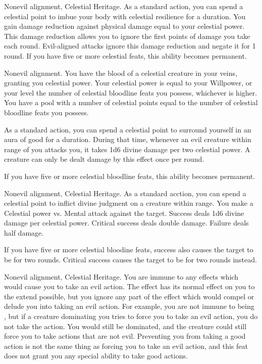 \featpres Nonevil alignment, Celestial Heritage.
\featben As a standard action, you can spend a celestial point to imbue your body with celestial resilience for a \durshort duration.
You gain damage reduction against physical damage equal to your celestial power.
This damage reduction allows you to ignore the first points of damage you take each round.
Evil-aligned attacks ignore this damage reduction and negate it for 1 round.
If you have five or more celestial feats, this ability becomes permanent.

\featpre Nonevil alignment.
\featben You have the blood of a celestial creature in your veins, granting you celestial power.
Your celestial power is equal to your Willpower, or your level \add the number of celestial bloodline feats you possess, whichever is higher.
You have a pool with a number of celestial points equal to the number of celestial bloodline feats you possess.

As a standard action, you can spend a celestial point to surround yourself in an aura of good for a \durshort duration.
During that time, whenever an evil creature within \rngclose range of you attacks you, it takes 1d6 divine damage per two celestial power.
A creature can only be dealt damage by this effect once per round.

If you have five or more celestial bloodline feats, this ability becomes permanent.

\featpres Nonevil alignment, Celestial Heritage.
\featben As a standard acction, you can spend a celestial point to inflict divine judgment on a creature within \rngmed range.
You make a Celestial power vs. Mental attack against the target.
Success deals 1d6 divine damage per celestial power.
Critical success deals double damage.
Failure deals half damage.

If you have five or more celestial bloodine feats, success also causes the target to be \dazed for two rounds.
Critical success causes the target to be \stunned for two rounds instead.

\featpres Nonevil alignment, Celestial Heritage.
\featben You are immune to any  effects which would cause you to take an evil action.
The effect has its normal effect on you to the extend possible, but you ignore any part of the effect which would compel or delude you into taking an evil action.
For example, you are not immune to being , but if a creature dominating you tries to force you to take an evil action, you do not take the action.
You would still be dominated, and the creature could still force you to take actions that are not evil.
Preventing you from taking a good action is not the same thing as forcing you to take an evil action, and this feat does not grant you any special ability to take good actions.

